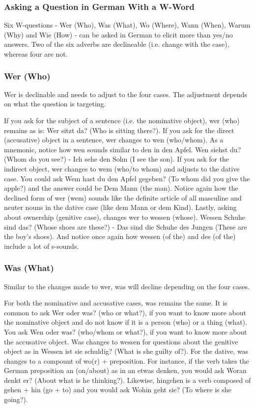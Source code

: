 \subsubsection{Asking a Question in German With a W-Word}

Six W-questions - Wer (Who), Was (What), Wo (Where), Wann (When), Warum (Why) and Wie (How) - can be asked in German to elicit more than yes/no answers. Two of the six adverbs are declineable (i.e. change with the case), whereas four are not.

\subsubsection{Wer (Who)}

Wer is declinable and needs to adjust to the four cases. The adjustment depends on what the question is targeting.

    If you ask for the subject of a sentence (i.e. the nominative object), wer (who) remains as is: Wer sitzt da? (Who is sitting there?).
    If you ask for the direct (accusative) object in a sentence, wer changes to wen (who/whom). As a mnemonic, notice how wen sounds similar to den in den Apfel. Wen siehst du? (Whom do you see?) - Ich sehe den Sohn (I see the son).
    If you ask for the indirect object, wer changes to wem (who/to whom) and adjusts to the dative case. You could ask Wem hast du den Apfel gegeben? (To whom did you give the apple?) and the answer could be Dem Mann (the man). Notice again how the declined form of wer (wem) sounds like the definite article of all masculine and neuter nouns in the dative case (like dem Mann or dem Kind).
    Lastly, asking about ownership (genitive case), changes wer to wessen (whose). Wessen Schuhe sind das? (Whose shoes are these?) - Das sind die Schuhe des Jungen (These are the boy’s shoes). And notice once again how wessen (of the) and des (of the) include a lot of s-sounds.

\subsubsection{Was (What)}

Similar to the changes made to wer, was will decline depending on the four cases.

    For both the nominative and accusative cases, was remains the same. It is common to ask Wer oder was? (who or what?), if you want to know more about the nominative object and do not know if it is a person (who) or a thing (what). You ask Wen oder was? (who/whom or what?), if you want to know more about the accusative object.
    Was changes to wessen for questions about the genitive object as in Wessen ist sie schuldig? (What is she guilty of?).
    For the dative, was changes to a compount of wo(r) + preposition. For instance, if the verb takes the German preposition an (on/about) as in an etwas denken, you would ask Woran denkt er? (About what is he thinking?). Likewise, hingehen is a verb composed of gehen + hin (go + to) and you would ask Wohin geht sie? (To where is she going?).

